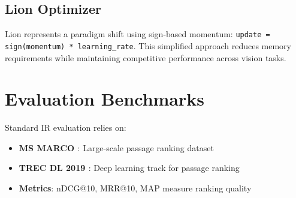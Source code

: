 \subsection{Lion Optimizer}
Lion \cite{chen2023symbolic} represents a paradigm shift using sign-based momentum: \texttt{update = sign(momentum) * learning\_rate}. This simplified approach reduces memory requirements while maintaining competitive performance across vision tasks.

\section{Evaluation Benchmarks}

Standard IR evaluation relies on:
\begin{itemize}
\item \textbf{MS MARCO \cite{DBLP:journals/corr/NguyenRSGTMD16}}: Large-scale passage ranking dataset
\item \textbf{TREC DL 2019 \cite{craswell2020overview}}: Deep learning track for passage ranking
\item \textbf{Metrics}: nDCG@10, MRR@10, MAP measure ranking quality
\end{itemize}







